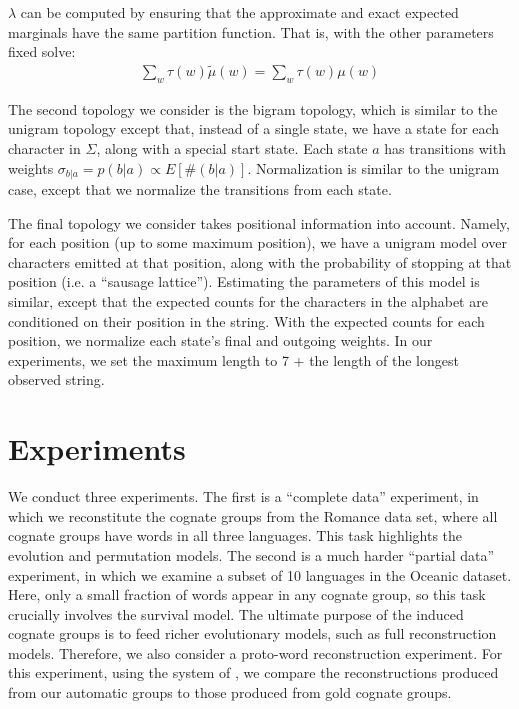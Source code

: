 \documentclass[11pt,a4paper]{article}
\begin{document}
$\lambda$ can be computed by ensuring that the
approximate and exact expected marginals have the same partition
function. That is, with the other parameters fixed solve:
\begin{equation*}
  \begin{split}
    \sum_w \tau(w) \tilde\mu(w) = \sum_w \tau(w) \mu(w)
  \end{split}
\end{equation*}

The second topology we consider is the bigram topology, which is
similar to the unigram topology except that, instead of a single
state, we have a state for each character in $\Sigma$, along with
a special start state. Each state $a$ has transitions with weights
$\sigma_{b|a}= p(b|a) \propto E[\#(b|a)]$. Normalization is similar
to the unigram case, except that we normalize the transitions from
each state.

The final topology we consider takes positional information into
account. Namely, for each position (up to some maximum position),
we have a unigram model over characters emitted at that position,
along with the probability of stopping at that position (i.e. a
``sausage lattice''). Estimating the parameters of this model is
similar, except that the expected counts for the characters in the
alphabet are conditioned on their position in the string. With the
expected counts for each position, we normalize each state's final
and outgoing weights. In our experiments, we set the maximum length
to 7 + the length of the longest observed string.

\section{Experiments}

We conduct three experiments. The first is a ``complete data''
experiment, in which we reconstitute the cognate groups from the
Romance data set, where all cognate groups have words in all three
languages.  This task highlights the evolution and permutation
models.  The second is a much harder ``partial data'' experiment,
in which we examine a subset of 10 languages in the Oceanic dataset.
Here, only a small fraction of words appear in any cognate group,
so this task crucially involves the survival model.  The ultimate
purpose of the induced cognate groups is to feed richer evolutionary
models, such as full reconstruction models.  Therefore, we also
consider a proto-word reconstruction experiment.  For this experiment,
using the system of , we compare the
reconstructions produced from our automatic groups to those produced
from gold cognate groups.
\end{document}
